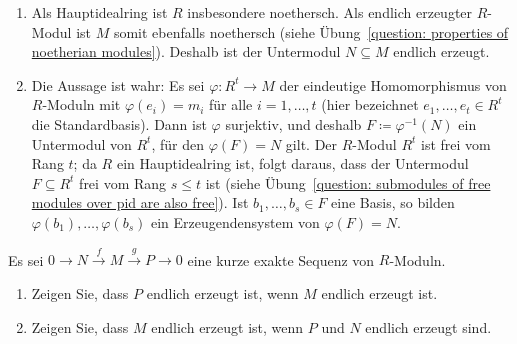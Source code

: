 \begin{solution}
  \begin{enumerate}
    \item
      Als Hauptidealring ist $R$ insbesondere noethersch.
      Als endlich erzeugter $R$-Modul ist $M$ somit ebenfalls noethersch (siehe Übung~\ref{question: properties of noetherian modules}).
      Deshalb ist der Untermodul $N \subseteq M$ endlich erzeugt.
    \item
      Die Aussage ist wahr:
      Es sei $\varphi \colon R^t \to M$ der eindeutige Homomorphismus von $R$-Moduln mit $\varphi(e_i) = m_i$ für alle $i = 1, \dotsc, t$ (hier bezeichnet $e_1, \dotsc, e_t \in R^t$ die Standardbasis).
      Dann ist $\varphi$ surjektiv, und deshalb $F \coloneqq \varphi^{-1}(N)$ ein Untermodul von $R^t$, für den $\varphi(F) = N$ gilt.
      Der $R$-Modul $R^t$ ist frei vom Rang $t$; da $R$ ein Hauptidealring ist, folgt daraus, dass der Untermodul $F \subseteq R^t$ frei vom Rang $s \leq t$ ist (siehe Übung~\ref{question: submodules of free modules over pid are also free}).
      Ist $b_1, \dotsc, b_s \in F$ eine Basis, so bilden $\varphi(b_1), \dotsc, \varphi(b_s)$ ein Erzeugendensystem von $\varphi(F) = N$.
  \end{enumerate}
\end{solution}


\begin{question}
  \label{question: finitely generated in short exact sequences}
  Es sei $0 \to N \xrightarrow{f} M \xrightarrow{g} P \to 0$ eine kurze exakte Sequenz von $R$-Moduln.
  \begin{enumerate}
    \item
      Zeigen Sie, dass $P$ endlich erzeugt ist, wenn $M$ endlich erzeugt ist.
    \item
      Zeigen Sie, dass $M$ endlich erzeugt ist, wenn $P$ und $N$ endlich erzeugt sind.
  \end{enumerate}
\end{question}


